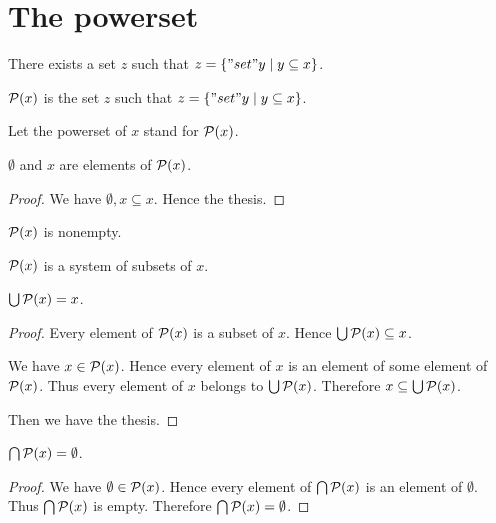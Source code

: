 \documentclass[../../sets-and-functions.ftl.tex]{subfiles}
\begin{document}
  \section{The powerset}

  \begin{forthel}
    \begin{axiom}
      There exists a set $z$ such that $z = \{ "set" y \mid y \subseteq x \}$.
    \end{axiom}

    \begin{definition}
      $\mathcal{P}(x)$ is the set $z$ such that $z = \{ "set" y \mid y \subseteq x \}$.
    \end{definition}

    Let the powerset of $x$ stand for $\mathcal{P}(x)$.

    \begin{proposition}[SF 01 02 481481]
      $\emptyset$ and $x$ are elements of $\mathcal{P}(x)$.
    \end{proposition}
    \begin{proof}
      We have $\emptyset, x \subseteq x$.
      Hence the thesis.
    \end{proof}

    \begin{corollary}[SF 01 02 671341]
      $\mathcal{P}(x)$ is nonempty.
    \end{corollary}

    \begin{proposition}[SF 01 02 833606]
      $\mathcal{P}(x)$ is a system of subsets of $x$.
    \end{proposition}

    \begin{proposition}[SF 01 02 706547]
      $\bigcup \mathcal{P}(x) = x$.
    \end{proposition}
    \begin{proof}
      Every element of $\mathcal{P}(x)$ is a subset of $x$.
      Hence $\bigcup \mathcal{P}(x) \subseteq x$.

      We have $x \in \mathcal{P}(x)$.
      Hence every element of $x$ is an element of some element of $\mathcal{P}(x)$.
      Thus every element of $x$ belongs to $\bigcup \mathcal{P}(x)$.
      Therefore $x \subseteq \bigcup \mathcal{P}(x)$.

      Then we have the thesis.
    \end{proof}

    \begin{proposition}[SF 01 02 818609]
      $\bigcap \mathcal{P}(x) = \emptyset$.
    \end{proposition}
    \begin{proof}
      We have $\emptyset \in \mathcal{P}(x)$.
      Hence every element of $\bigcap \mathcal{P}(x)$ is an element of $\emptyset$.
      Thus $\bigcap \mathcal{P}(x)$ is empty.
      Therefore $\bigcap \mathcal{P}(x) = \emptyset$.
    \end{proof}
  \end{forthel}
\end{document}
